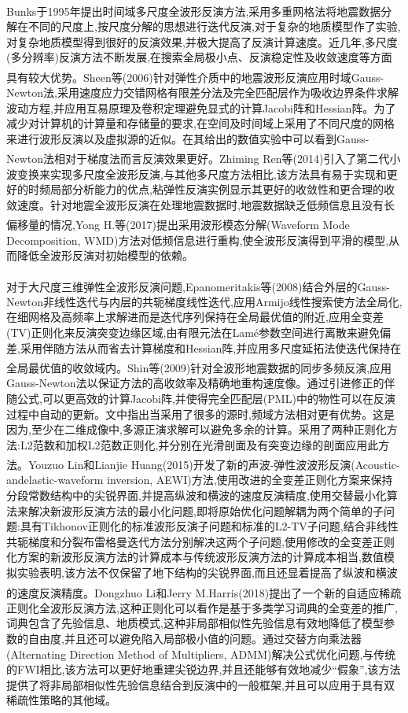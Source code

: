 \documentclass[11pt]{article}
\newcommand{\upcite}[1]{\textsuperscript{\textsuperscript{\cite{#1}}}}
\begin{document}
Bunks\upcite{Bunks1995}于1995年提出时间域多尺度全波形反演方法,采用多重网格法将地震数据分解在不同的尺度上,按尺度分解的思想进行迭代反演,对于复杂的地质模型作了实验,对复杂地质模型得到很好的反演效果,并极大提高了反演计算速度。近几年,多尺度(多分辨率)反演方法不断发展,在搜索全局极小点、反演稳定性及收敛速度等方面具有较大优势。Sheen等\upcite{Sheen2006}(2006)针对弹性介质中的地震波形反演应用时域Gauss-Newton法,采用速度应力交错网格有限差分法及完全匹配层作为吸收边界条件求解波动方程,并应用互易原理及卷积定理避免显式的计算Jacobi阵和Hessian阵。为了减少对计算机的计算量和存储量的要求,在空间及时间域上采用了不同尺度的网格来进行波形反演以及虚拟源的近似。在其给出的数值实验中可以看到Gauss-Newton法相对于梯度法而言反演效果更好。Zhiming Ren等\upcite{RenZ2014}(2014)引入了第二代小波变换来实现多尺度全波形反演,与其他多尺度方法相比,该方法具有易于实现和更好的时频局部分析能力的优点,粘弹性反演实例显示其更好的收敛性和更合理的收敛速度。针对地震全波形反演在处理地震数据时,地震数据缺乏低频信息且没有长偏移量的情况,Yong H.等\upcite{YongH2017}(2017)提出采用波形模态分解(Waveform Mode Decomposition, WMD)方法对低频信息进行重构,使全波形反演得到平滑的模型,从而降低全波形反演对初始模型的依赖。
\par
对于大尺度三维弹性全波形反演问题,Epanomeritakis等\upcite{Epanomeritakis2008}(2008)结合外层的Gauss-Newton非线性迭代与内层的共轭梯度线性迭代,应用Armijo线性搜索使方法全局化,在细网格及高频率上求解进而是迭代序列保持在全局最优值的附近,应用全变差(TV)正则化来反演突变边缘区域,由有限元法在Lamé参数空间进行离散来避免偏差,采用伴随方法从而省去计算梯度和Hessian阵,并应用多尺度延拓法使迭代保持在全局最优值的收敛域内。Shin等\upcite{Shin2009}(2009)针对全波形地震数据的同步多频反演,应用Gauss-Newton法以保证方法的高收敛率及精确地重构速度像。通过引进修正的伴随公式,可以更高效的计算Jacobi阵,并使得完全匹配层(PML)中的物性可以在反演过程中自动的更新。文中指出当采用了很多的源时,频域方法相对更有优势。这是因为,至少在二维成像中,多源正演求解可以避免多余的计算。采用了两种正则化方法:L2范数和加权L2范数正则化,并分别在光滑剖面及有突变边缘的剖面应用此方法。Youzuo Lin和Lianjie Huang\upcite{LinY2015}(2015)开发了新的声波-弹性波波形反演(Acoustic-andelastic-waveform inversion, AEWI)方法,使用改进的全变差正则化方案来保持分段常数结构中的尖锐界面,并提高纵波和横波的速度反演精度,使用交替最小化算法来解决新波形反演方法的最小化问题,即将原始优化问题解耦为两个简单的子问题:具有Tikhonov正则化的标准波形反演子问题和标准的L2-TV子问题,结合非线性共轭梯度和分裂布雷格曼迭代方法分别解决这两个子问题,使用修改的全变差正则化方案的新波形反演方法的计算成本与传统波形反演方法的计算成本相当,数值模拟实验表明,该方法不仅保留了地下结构的尖锐界面,而且还显着提高了纵波和横波的速度反演精度。Dongzhuo Li和Jerry M.Harris\upcite{LiD2018}(2018)提出了一个新的自适应稀疏正则化全波形反演方法,这种正则化可以看作是基于多类学习词典的全变差的推广,词典包含了先验信息、地质模式,这种非局部相似性先验信息有效地降低了模型参数的自由度,并且还可以避免陷入局部极小值的问题。通过交替方向乘法器(Alternating Direction Method of Multipliers, ADMM)解决公式优化问题,与传统的FWI相比,该方法可以更好地重建尖锐边界,并且还能够有效地减少``假象'',该方法提供了将非局部相似性先验信息结合到反演中的一般框架,并且可以应用于具有双稀疏性策略的其他域。
\par
\newpage
\end{document}
